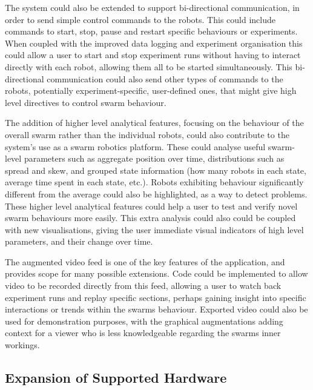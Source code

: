 The system could also be extended to support bi-directional communication, in order to send simple control commands to the robots. This could include commands to start, stop, pause and restart specific behaviours or experiments. When coupled with the improved data logging and experiment organisation this could allow a user to start and stop experiment runs without having to interact directly with each robot, allowing them all to be started simultaneously. This bi-directional communication could also send other types of commands to the robots, potentially experiment-specific, user-defined ones, that might give high level directives to control swarm behaviour.

The addition of higher level analytical features, focusing on the behaviour of the overall swarm rather than the individual robots, could also contribute to the system's use as a swarm robotics platform. These could analyse useful swarm-level parameters such as aggregate position over time, distributions such as spread and skew, and grouped state information (how many robots in each state, average time spent in each state, etc.). Robots exhibiting behaviour significantly different from the average could also be highlighted, as a way to detect problems. These higher level analytical features could help a user to test and verify novel swarm behaviours more easily. This extra analysis could also could be coupled with new visualisations, giving the user immediate visual indicators of high level parameters, and their change over time.

The augmented video feed is one of the key features of the application, and provides scope for many possible extensions. Code could be implemented to allow video to be recorded directly from this feed, allowing a user to watch back experiment runs and replay specific sections, perhaps gaining insight into specific interactions or trends within the swarms behaviour. Exported video could also be used for demonstration purposes, with the graphical augmentations adding context for a viewer who is less knowledgeable regarding the swarms inner workings.


\subsection{Expansion of Supported Hardware} \label{HardwareExpansion}

